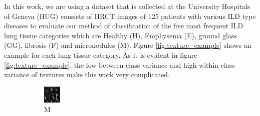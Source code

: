 \documentclass[conference]{IEEEtran}
\begin{document}
In this work, we are using a dataset that is collected at the University Hospitals of Geneva (HUG) \cite{dataset} consists of HRCT images of 125 patients with various ILD type diseases to evaluate our method of classification of the five most frequent ILD lung tissue categories which are Healthy (H), Emphysema (E), ground glass (GG), fibrosis (F) and micronodules (M). Figure \ref{fig:texture_example} shows an example for each lung tissue category. As it is evident in figure \ref{fig:texture_example}, the low between-class variance and high within-class variance of textures make this work very complicated.

\begin{figure}[tbh]
  \centering
  \begin{subfigure}{0.092\textwidth}
    \centering
    \includegraphics[width=\linewidth]{images/micronodules.png}
    \caption{M}
  \end{subfigure}
  \centering
  \begin{subfigure}{0.092\textwidth}
    \centering

\end{subfigure}
\end{figure}
\end{document}
